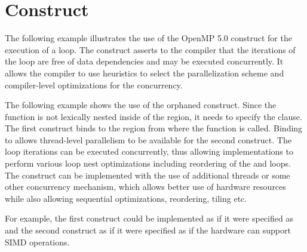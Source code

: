 \section{ Construct}
\label{sec:loop}

The following example illustrates the use of the OpenMP 5.0 
construct for the execution of a loop.
The  construct asserts to the compiler that the iterations 
of the loop are free of data dependencies and may be executed concurrently.
It allows the compiler to use heuristics to select the parallelization scheme
and compiler-level optimizations for the concurrency. 


The following example shows the use of the orphaned  construct. Since the 
function  is not lexically nested inside of the  region, it needs to specify 
the  clause. The first  construct binds to the  region 
from where the function  is called. Binding to  allows thread-level 
parallelism to be available for the second  construct.
The loop iterations can be executed concurrently, 
thus allowing implementations to perform various loop nest optimizations including
reordering of the   and  loops. The  construct can be implemented 
with the use of additional threads or some other concurrency mechanism, which allows better use of hardware resources while also allowing sequential optimizations, reordering, tiling etc.

For example, the first  construct could be implemented as if it were specified as 
 and the second  construct as if it were specified as 
 if the hardware can support SIMD operations.

